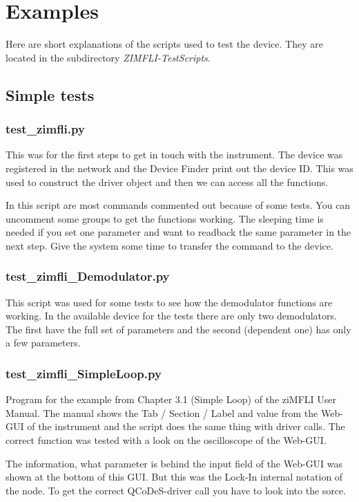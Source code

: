 \documentclass[11pt]{article} %
\begin{document}
\clearpage

\section{Examples}

Here are short explanations of the scripts used to test the device. They are located in the subdirectory {\it ZIMFLI-TestScripts}.


\subsection{Simple tests}

\subsubsection{test\_zimfli.py}
This was for the first steps to get in touch with the instrument. The device was registered in the network and the Device Finder print out the device ID. This was used to construct the driver object and then we can access all the functions.

In this script are most commands commented out because of some tests. You can uncomment some groups to get the functions working. The sleeping time is needed if you set one parameter and want to readback the same parameter in the next step. Give the system some time to transfer the command to the device.

\subsubsection{test\_zimfli\_Demodulator.py}
This script was used for some tests to see how the demodulator functions are working. In the available device for the tests there are only two demodulators. The first have the full set of parameters and the second (dependent one) has only a few parameters.

\subsubsection{test\_zimfli\_SimpleLoop.py}
Program for the example from Chapter 3.1 (Simple Loop) of the ziMFLI User Manual. The manual shows the Tab / Section / Label and value from the Web-GUI of the instrument and the script does the same thing with driver calls. The correct function was tested with a look on the oscilloscope of the Web-GUI.

The information, what parameter is behind the input field of the Web-GUI was shown at the bottom of this GUI. But this was the Lock-In internal notation of the node. To get the correct QCoDeS-driver call you have to look into the sorce.
\end{document}
